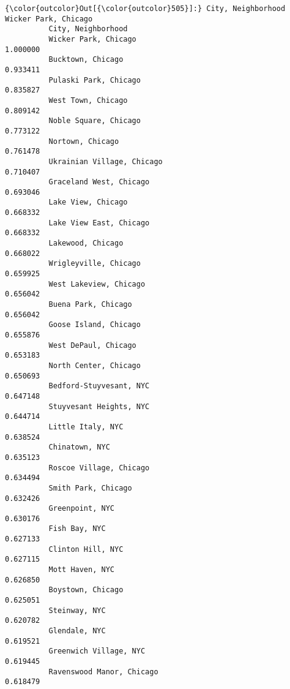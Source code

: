 \documentclass[11pt]{article}
\begin{document}
\begin{Verbatim}[commandchars=\\\{\}]
{\color{outcolor}Out[{\color{outcolor}505}]:} City, Neighborhood                         Wicker Park, Chicago
          City, Neighborhood                                             
          Wicker Park, Chicago                                   1.000000
          Bucktown, Chicago                                      0.933411
          Pulaski Park, Chicago                                  0.835827
          West Town, Chicago                                     0.809142
          Noble Square, Chicago                                  0.773122
          Nortown, Chicago                                       0.761478
          Ukrainian Village, Chicago                             0.710407
          Graceland West, Chicago                                0.693046
          Lake View, Chicago                                     0.668332
          Lake View East, Chicago                                0.668332
          Lakewood, Chicago                                      0.668022
          Wrigleyville, Chicago                                  0.659925
          West Lakeview, Chicago                                 0.656042
          Buena Park, Chicago                                    0.656042
          Goose Island, Chicago                                  0.655876
          West DePaul, Chicago                                   0.653183
          North Center, Chicago                                  0.650693
          Bedford-Stuyvesant, NYC                                0.647148
          Stuyvesant Heights, NYC                                0.644714
          Little Italy, NYC                                      0.638524
          Chinatown, NYC                                         0.635123
          Roscoe Village, Chicago                                0.634494
          Smith Park, Chicago                                    0.632426
          Greenpoint, NYC                                        0.630176
          Fish Bay, NYC                                          0.627133
          Clinton Hill, NYC                                      0.627115
          Mott Haven, NYC                                        0.626850
          Boystown, Chicago                                      0.625051
          Steinway, NYC                                          0.620782
          Glendale, NYC                                          0.619521
          Greenwich Village, NYC                                 0.619445
          Ravenswood Manor, Chicago                              0.618479

\end{Verbatim}
\end{document}
